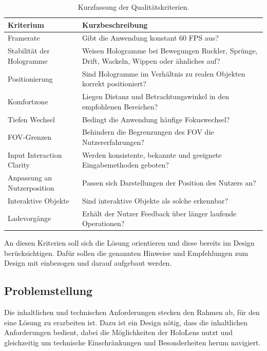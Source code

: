 \bgroup
\setlength\extrarowheight{-2pt}
\def\arraystretch{2}
\begin{table}[htb]
	\centering
	\begin{tabular}{l|l}
		Kriterium & Kurzbeschreibung \\
		\hline
		Framerate & Gibt die Anwendung konstant 60 FPS aus?\\
		Stabilität der Hologramme & Weisen Hologramme bei Bewegungen Ruckler, Sprünge, Drift, Wackeln, Wippen oder ähnliches auf?\\
		Positionierung & Sind Hologramme im Verhältnis zu realen Objekten korrekt positioniert?\\
		Komfortzone & Liegen Distanz und Betrachtungswinkel in den empfohlenen Bereichen?\\
		Tiefen Wechsel & Bedingt die Anwendung häufige Fokuswechsel?\\
		FOV-Grenzen & Behindern die Begrenzungen des FOV die Nutzererfahrungen?\\
		Input Interaction Clarity & Werden konsistente, bekannte und geeignete Eingabemethoden geboten?\\
		Anpassung an Nutzerposition & Passen sich Darstellungen der Position des Nutzers an?\\
		Interaktive Objekte & Sind interaktive Objekte als solche erkennbar?\\
		Ladevorgänge  & Erhält der Nutzer Feedback über länger laufende Operationen?\\
	\end{tabular}\caption{\label{tab:tech_criteria} Kurzfassung der Qualitätskriterien.}
\end{table}
\egroup

An diesen Kriterien soll sich die Lösung orientieren und diese bereits im Design berücksichtigen. Dafür sollen die genannten Hinweise und Empfehlungen zum Design mit einbezogen und darauf aufgebaut werden.\\

\subsection{Problemstellung}
\label{sec-3-2}
Die inhaltlichen und technischen Anforderungen stecken den Rahmen ab, für den eine Lösung zu erarbeiten ist. Dazu ist ein Design nötig, dass die inhaltlichen Anforderungen bedient, dabei die Möglichkeiten der HoloLens nutzt und gleichzeitig um technische Einschränkungen und Besonderheiten herum navigiert.\\

